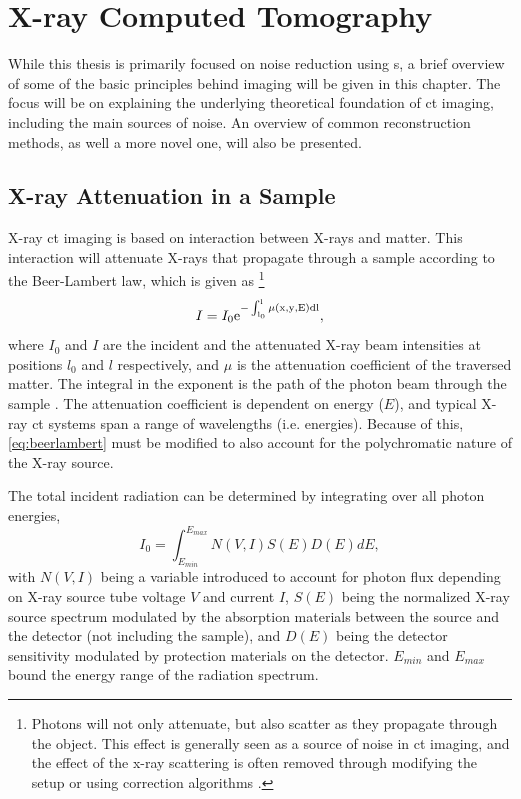 \chapter{X-ray Computed Tomography}
\label{sec:ct}
While this thesis is primarily focused on noise reduction using s, a brief overview of some of the basic principles behind  imaging will be given in this chapter. The focus will be on explaining the underlying theoretical foundation of \gls{ct} imaging, including the main sources of noise. An overview of common reconstruction methods, as well a more novel one, will also be presented.

\section{X-ray Attenuation in a Sample}
\label{sec:ct:theoreticalfoundation}
X-ray \gls{ct} imaging is based on interaction between X-rays and matter. This interaction will attenuate X-rays that propagate through a sample according to the Beer-Lambert law, which is given as \cite{doi:10.1063/1.4950807} \footnote{Photons will not only attenuate, but also scatter as they propagate through the object. This effect is generally seen as a source of noise in \gls{ct} imaging, and the effect of the x-ray scattering is often removed through modifying the setup or using correction algorithms \cite{10.1118/1.1711475}.}
\begin{equation}
    \label{eq:beerlambert}
    I = I_0 \rm{e}^{-\int_{l_0}^{l}\mu\left(x,y,E\right)dl},
\end{equation}
where $I_0$ and $I$ are the incident and the attenuated X-ray beam intensities at positions $l_0$ and $l$ respectively, and $\mu$ is the attenuation coefficient of the traversed matter. The integral in the exponent is the path of the photon beam through the sample \cite{KakSlaney98}. The attenuation coefficient is dependent on energy ($E$), and typical X-ray \gls{ct} systems span a range of wavelengths (i.e. energies). Because of this, \cref{eq:beerlambert} must be modified to also account for the polychromatic nature of the X-ray source. 

The total incident radiation can be determined by integrating over all photon energies, 
\begin{equation}
    \label{eq:incidentradiation}
    I_0 = \int_{E_{min}}^{E_{max}}N\left(V,I\right)S\left(E\right)D\left(E\right)dE,
\end{equation}
with $N\left(V,I\right)$ being a variable introduced to account for photon flux depending on X-ray source tube voltage $V$ and current $I$, $S\left(E\right)$ being the normalized X-ray source spectrum modulated by the absorption materials between the source and the detector (not including the sample), and $D\left(E\right)$ being the detector sensitivity modulated by protection materials on the detector. $E_{min}$ and $E_{max}$ bound the energy range of the radiation spectrum. 

